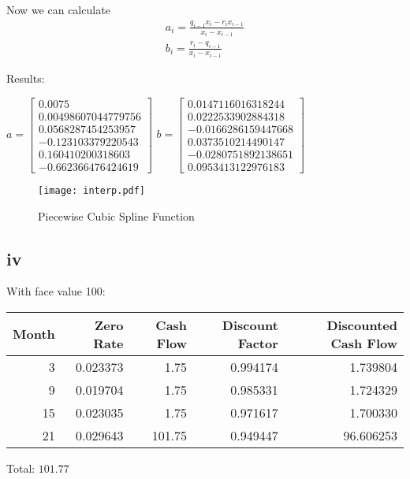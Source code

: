 \documentclass{article}
\begin{document}
Now we can calculate
\[\begin{array}{l}
        {a_i} = \frac{{{q_{i - 1}}{x_i} - {r_i}{x_{i - 1}}}}{{{x_i} - {x_{i - 1}}}} \\
        {b_i} = \frac{{{r_i} - {q_{i - 1}}}}{{{x_i} - {x_{i - 1}}}}
    \end{array}\]

Results:

$a = \displaystyle \left[\begin{matrix}0.0075\\0.00498607044779756\\0.0568287454253957\\-0.123103379220543\\0.160410200318603\\-0.662366476424619\end{matrix}\right]$
$b = \displaystyle \left[\begin{matrix}0.0147116016318244\\0.0222533902884318\\-0.0166286159447668\\0.0373510214490147\\-0.0280751892138651\\0.0953413122976183\end{matrix}\right]$

\begin{figure}[h]
    \centering
    \texttt{[image: interp.pdf]}
    \caption{Piecewise Cubic Spline Function}
    \label{fig:spline_plot}
\end{figure}


\subsection*{iv}
With face value 100:

\begin{tabular}{rrrrr}
    \toprule
    Month & Zero Rate & Cash Flow & Discount Factor & Discounted Cash Flow \\
    \midrule
    3     & 0.023373  & 1.75      & 0.994174        & 1.739804             \\
    9     & 0.019704  & 1.75      & 0.985331        & 1.724329             \\
    15    & 0.023035  & 1.75      & 0.971617        & 1.700330             \\
    21    & 0.029643  & 101.75    & 0.949447        & 96.606253            \\
    \bottomrule
\end{tabular}
Total: $\displaystyle 101.77$
\end{document}
